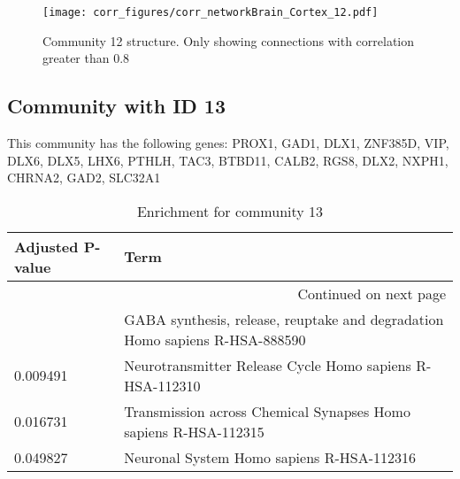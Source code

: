 \begin{figure}[h!]
\centering
\texttt{[image: corr\_figures/corr\_networkBrain\_Cortex\_12.pdf]}
\caption{Community 12 structure. Only showing connections with correlation greater than 0.8}
\end{figure}




\subsection*{Community with ID 13}
This community has the following genes: PROX1, GAD1, DLX1, ZNF385D, VIP, DLX6, DLX5, LHX6, PTHLH, TAC3, BTBD11, CALB2, RGS8, DLX2, NXPH1, CHRNA2, GAD2, SLC32A1
\\
\begin{longtable}{p{2.4cm}p{14.5cm}}
\caption{Enrichment for community 13}\\
\toprule
Adjusted \newline P-value &                                                                         Term \\
\midrule
\endhead
\midrule
\multicolumn{2}{r}{{Continued on next page}} \\
\midrule
\endfoot

\bottomrule
\endlastfoot
                 0.000899 &  GABA synthesis, release, reuptake and degradation Homo sapiens R-HSA-888590 \\
                 0.009491 &                     Neurotransmitter Release Cycle Homo sapiens R-HSA-112310 \\
                 0.016731 &              Transmission across Chemical Synapses Homo sapiens R-HSA-112315 \\
                 0.049827 &                                    Neuronal System Homo sapiens R-HSA-112316 \\
\end{longtable}


